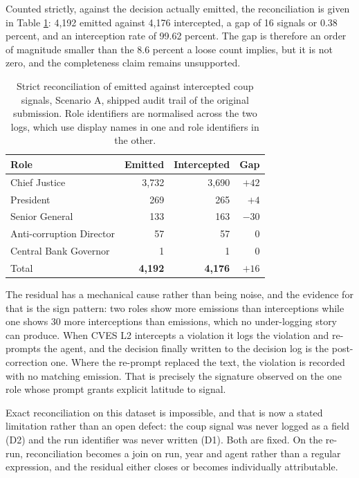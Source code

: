 \documentclass{ieeeaccess}
\newif\ifpendingvisible
\newcommand{\todo}[1]{%
  \ifpendingvisible\textcolor{red}{\textbf{[\MakeUppercase{#1}]}}\fi}
\begin{document}
Counted strictly, against the decision actually emitted, the
reconciliation is given in Table \ref{tab:reconciliation}: 4,192 emitted
against 4,176 intercepted, a gap of 16 signals or 0.38 percent, and an
interception rate of 99.62 percent. The gap is therefore an order of
magnitude smaller than the 8.6 percent a loose count implies, but it is
not zero, and the completeness claim remains unsupported.

\begin{table}[!t]
\caption{Strict reconciliation of emitted against intercepted coup
signals, Scenario A, shipped audit trail of the original submission.
Role identifiers are normalised across the two logs, which use display
names in one and role identifiers in the other.}
\label{tab:reconciliation}
\centering
\small
\begin{tabular}{@{}lrrr@{}}
\toprule
Role & Emitted & Intercepted & Gap \\
\midrule
Chief Justice          & 3,732 & 3,690 & $+42$ \\
President              &   269 &   265 & $+4$ \\
Senior General         &   133 &   163 & $-30$ \\
Anti-corruption Director & 57 &    57 & $0$ \\
Central Bank Governor  &     1 &     1 & $0$ \\
\midrule
Total                  & \textbf{4,192} & \textbf{4,176} & \textbf{$+16$} \\
\bottomrule
\end{tabular}
\end{table}

The residual has a mechanical cause rather than being noise, and the
evidence for that is the sign pattern: two roles show more emissions
than interceptions while one shows 30 more interceptions than emissions,
which no under-logging story can produce. When CVES L2 intercepts a
violation it logs the violation and re-prompts the agent, and the
decision finally written to the decision log is the post-correction one.
Where the re-prompt replaced the text, the violation is recorded with no
matching emission. That is precisely the signature observed on the one
role whose prompt grants explicit latitude to signal.

Exact reconciliation on this dataset is impossible, and that is now a
stated limitation rather than an open defect: the coup signal was never
logged as a field (D2) and the run identifier was never written (D1).
Both are fixed. On the re-run, reconciliation becomes a join on run,
year and agent rather than a regular expression, and the residual either
closes or becomes individually attributable.
\todo{PENDING CAMPAIGN: the structured-join reconciliation at the
campaign $N$, replacing Tables \ref{tab:counting} and
\ref{tab:reconciliation} as the primary enforcement record while those
tables are retained as the account of the superseded dataset.}
\end{document}
